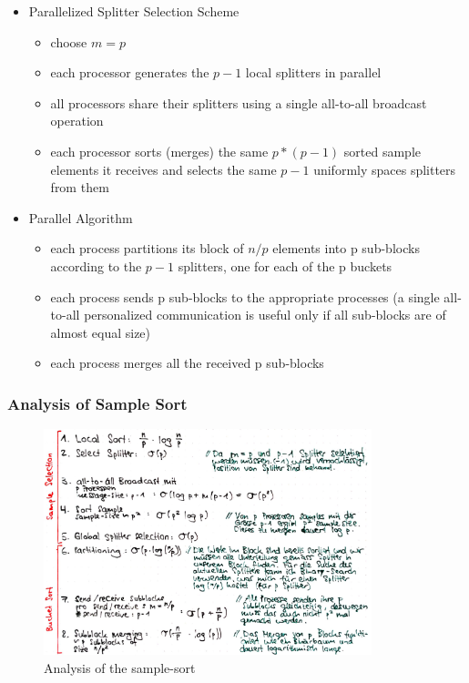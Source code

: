 \begin{itemize}
\tightlist
\item
  Parallelized Splitter Selection Scheme

  \begin{itemize}
  \tightlist
  \item
    choose $m = p$
  \item
    each processor generates the $p - 1$ local splitters in parallel
  \item
    all processors share their splitters using a single all-to-all
    broadcast operation
  \item
    each processor sorts (merges) the same $p*(p- 1)$ sorted sample
    elements it receives and selects the same $p - 1$ uniformly spaces
    splitters from them
  \end{itemize}
\item
  Parallel Algorithm

  \begin{itemize}
  \tightlist
  \item
    each process partitions its block of $n/p$ elements into p sub-blocks
    according to the $p - 1$ splitters, one for each of the p buckets
  \item
    each process sends p sub-blocks to the appropriate processes (a
    single all-to-all personalized communication is useful only if all
    sub-blocks are of almost equal size)
  \item
    each process merges all the received p sub-blocks
  \end{itemize}
\end{itemize}

\hypertarget{analysis-of-sample-sort}{%
\subsubsection{Analysis of Sample Sort}\label{analysis-of-sample-sort}}

\begin{figure}[H]
\centering
\includegraphics[width=0.85\textwidth]{figures/analysis-samplesort.png}
\caption{Analysis of the sample-sort}
\end{figure}

